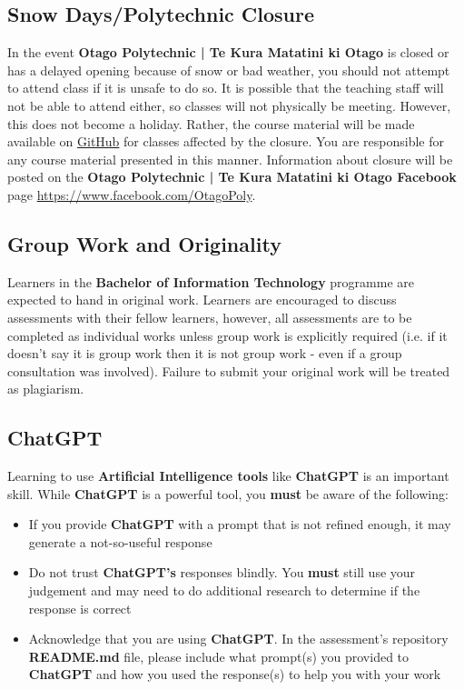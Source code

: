 \documentclass{article}
\begin{document}
\subsection*{Snow Days/Polytechnic Closure}
In the event \textbf{Otago Polytechnic | Te Kura Matatini ki Otago} is closed or has a delayed opening because of snow or bad weather, you should not attempt to attend class if it is unsafe to do so. It is possible that the teaching staff will not be able to attend either, so classes will not physically be meeting. However, this does not become a holiday. Rather, the course material will be made available on \href{https://github.com/otago-polytechnic-bit-courses/ID737001-game-development}{GitHub} for classes affected by the closure. You are responsible for any course material presented in this manner. Information about closure will be posted on the \textbf{Otago Polytechnic | Te Kura Matatini ki Otago Facebook} page \href{https://www.facebook.com/OtagoPoly}{https://www.facebook.com/OtagoPoly}.

\subsection*{Group Work and Originality}
Learners in the \textbf{Bachelor of Information Technology} programme are expected to hand in original work. Learners are encouraged to discuss assessments with their fellow learners, however, all assessments are to be completed as individual works unless group work is explicitly required (i.e. if it doesn't say it is group work then it is not group work - even if a group consultation was involved). Failure to submit your original work will be treated as plagiarism.

\subsection*{ChatGPT}
Learning to use \textbf{Artificial Intelligence tools} like \textbf{ChatGPT} is an important skill. While \textbf{ChatGPT} is a powerful tool, you \textbf{must} be aware of the following:

\begin{itemize}
    \item If you provide \textbf{ChatGPT} with a prompt that is not refined enough, it may generate a not-so-useful response
    \item Do not trust \textbf{ChatGPT's} responses blindly. You \textbf{must} still use your judgement and may need to do additional research to determine if the response is correct
    \item Acknowledge that you are using \textbf{ChatGPT}. In the assessment's repository \textbf{README.md} file, please include what prompt(s) you provided to \textbf{ChatGPT} and how you used the response(s) to help you with your work
\end{itemize}
\end{document}
